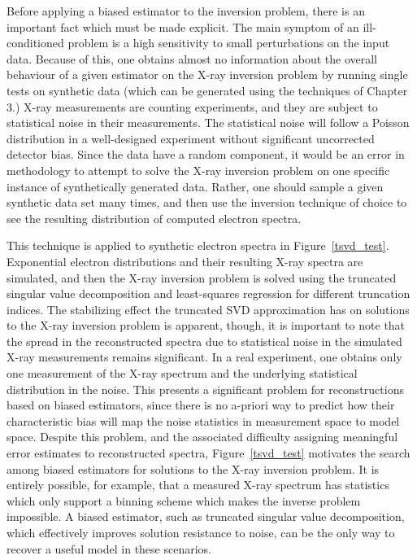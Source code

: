 Before applying a biased estimator to the inversion problem, there is an important fact which must be made explicit. The main symptom of an ill-conditioned problem is a high sensitivity to small perturbations on the input data. Because of this, one obtains almost no information about the overall behaviour of a given estimator on the X-ray inversion problem by running single tests on synthetic data (which can be generated using the techniques of Chapter 3.) X-ray measurements are counting experiments, and they are subject to statistical noise in their measurements. The statistical noise will follow a Poisson distribution in a well-designed experiment without significant uncorrected detector bias. Since the data have a random component, it would be an error in methodology to attempt to solve the X-ray inversion problem on one specific instance of synthetically generated data. Rather, one should sample a given synthetic data set many times, and then use the inversion technique of choice to see the resulting distribution of computed electron spectra. 

This technique is applied to synthetic electron spectra in Figure~\ref{tsvd_test}. Exponential electron distributions and their resulting X-ray spectra are simulated, and then the X-ray inversion problem is solved using the truncated singular value decomposition and least-squares regression for different truncation indices. The stabilizing effect the truncated SVD approximation has on solutions to the X-ray inversion problem is apparent, though, it is important to note that the spread in the reconstructed spectra due to statistical noise in the simulated X-ray measurements remains significant. In a real experiment, one obtains only one measurement of the X-ray spectrum and the underlying statistical distribution in the noise. This presents a significant problem for reconstructions based on biased estimators, since there is no a-priori way to predict how their characteristic bias will map the noise statistics in measurement space to model space. Despite this problem, and the associated difficulty assigning meaningful error estimates to reconstructed spectra, Figure~\ref{tsvd_test} motivates the search among biased estimators for solutions to the X-ray inversion problem. It is entirely possible, for example, that a measured X-ray spectrum has statistics which only support a binning scheme which makes the inverse problem impossible. A biased estimator, such as truncated singular value decomposition, which effectively improves solution resistance to noise, can be the only way to recover a useful model in these scenarios. 

